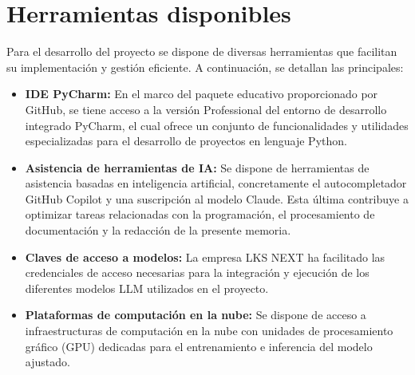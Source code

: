 \section{Herramientas disponibles}
Para el desarrollo del proyecto se dispone de diversas herramientas que facilitan su implementación y gestión eficiente. A continuación, se detallan las principales:
\begin{itemize}
\item\textbf{IDE PyCharm: }En el marco del paquete educativo proporcionado por GitHub, se tiene acceso a la versión Professional del entorno de desarrollo integrado PyCharm, el cual ofrece un conjunto de funcionalidades y utilidades especializadas para el desarrollo de proyectos en lenguaje Python.
\item\textbf{Asistencia de herramientas de IA: }Se dispone de herramientas de asistencia basadas en inteligencia artificial, concretamente el autocompletador GitHub Copilot y una suscripción al modelo Claude. Esta última contribuye a optimizar tareas relacionadas con la programación, el procesamiento de documentación y la redacción de la presente memoria.
\item\textbf{Claves de acceso a modelos: }La empresa LKS NEXT ha facilitado las credenciales de acceso necesarias para la integración y ejecución de los diferentes modelos LLM utilizados en el proyecto.
\item\textbf{Plataformas de computación en la nube: }Se dispone de acceso a infraestructuras de computación en la nube con unidades de procesamiento gráfico (GPU) dedicadas para el entrenamiento e inferencia del modelo ajustado.
\end{itemize}












